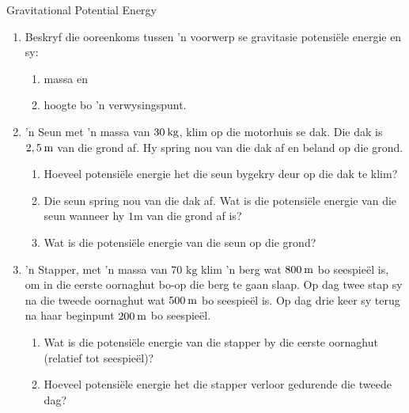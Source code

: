 \begin{exercises}{Gravitational Potential Energy }
            \nopagebreak
      \label{m38784*id66588}\begin{enumerate}[noitemsep, label=\textbf{\arabic*}. ] 
            \label{m38784*uid50}\item Beskryf die ooreenkoms tussen  'n voorwerp se gravitasie potensi\"{e}le energie en sy:
\label{m38784*id66604}\begin{enumerate}[noitemsep, label=\textbf{\alph*}. ] 
            \label{m38784*uid51}\item massa en 
\label{m38784*uid52}\item hoogte bo  'n verwysingspunt.
\end{enumerate}
                \label{m38784*uid53}\item  'n Seun met  'n massa van $30\phantom{\rule{2pt}{0ex}}\text{kg}$, klim op die motorhuis se dak. Die dak is $2,5\phantom{\rule{2pt}{0ex}}\text{m}$ van die grond af. Hy spring nou van die dak af en beland op die grond.
\label{m38784*id66646}\begin{enumerate}[noitemsep, label=\textbf{\alph*}. ] 
            \label{m38784*uid54}\item Hoeveel potensi\"{e}le energie het die seun bygekry deur op die dak te klim?
\label{m38784*uid55}\item Die seun spring nou van die dak af. Wat is die potensi\"{e}le energie van die seun wanneer hy $1 \text{m}$ van die grond af is?
\label{m38784*uid56}\item Wat is die potensi\"{e}le energie van die seun op die grond?
\end{enumerate}
                \label{m38784*uid57}\item  'n Stapper, met  'n massa van $70 \text{ kg}$ klim  'n berg wat $800\phantom{\rule{2pt}{0ex}}\text{m}$ bo seespie\"{e}l is, om in die eerste oornaghut bo-op die berg te gaan slaap. Op dag twee stap sy na die tweede oornaghut wat $500\phantom{\rule{2pt}{0ex}}\text{m}$ bo seespie\"{e}l is. Op dag drie keer sy terug na haar beginpunt $200\phantom{\rule{2pt}{0ex}}\text{m}$ bo seespie\"{e}l.
\label{m38784*id66702}\begin{enumerate}[noitemsep, label=\textbf{\alph*}. ] 
            \label{m38784*uid58}\item Wat is die potensi\"{e}le energie van die stapper by die eerste oornaghut (relatief tot seespie\"{e}l)?
\label{m38784*uid59}\item Hoeveel potensi\"{e}le energie het die stapper verloor gedurende die tweede dag?

\end{enumerate}
\end{enumerate}
\end{exercises}
